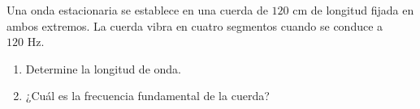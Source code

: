 \item Una onda estacionaria se establece en una cuerda de $120\text{ cm}$ de longitud fijada en ambos extremos. La cuerda vibra en cuatro segmentos cuando se conduce a $120\text{ Hz}$.
\begin{enumerate}
    \item Determine la longitud de onda.
    \item ¿Cuál es la frecuencia fundamental de la cuerda?
\end{enumerate}